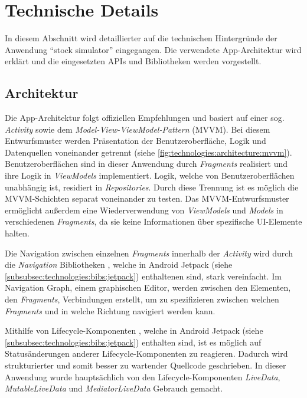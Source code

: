 \documentclass[a4paper]{article}
\begin{document}
\section{Technische Details}
\label{sec:technologies}
In diesem Abschnitt wird detaillierter auf die technischen Hintergründe der Anwendung "`stock simulator"' eingegangen. Die verwendete App-Architektur wird erklärt und die eingesetzten APIs und Bibliotheken werden vorgestellt.


\subsection{Architektur}
\label{subsec:technologies:architecture}
Die App-Architektur folgt offiziellen Empfehlungen \autocite{google_recommendations} und basiert auf einer sog. \textit{Activity} sowie dem \textit{Model-View-ViewModel-Pattern} (MVVM).
Bei diesem Entwurfsmuster werden Präsentation der Benutzeroberfläche, Logik und Datenquellen voneinander getrennt (siehe \autoref{fig:technologies:architecture:mvvm}).
Benutzeroberflächen sind in dieser Anwendung durch \textit{Fragments} realisiert und ihre Logik in \textit{ViewModels} implementiert.
Logik, welche von Benutzeroberflächen unabhängig ist, residiert in \textit{Repositories}.
Durch diese Trennung ist es möglich die MVVM-Schichten separat voneinander zu testen.
Das MVVM-Entwurfsmuster ermöglicht außerdem eine Wiederverwendung von \textit{ViewModels} und \textit{Models} in verschiedenen \textit{Fragments}, da sie keine Informationen über spezifische UI-Elemente halten.

Die Navigation zwischen einzelnen \textit{Fragments} innerhalb der \textit{Activity} wird durch die \textit{Navigation} Bibliotheken \autocite{android_navigation}, welche in Android Jetpack (siehe \autoref{subsubsec:technologies:bibs:jetpack}) enthaltenen sind, stark vereinfacht. Im Navigation Graph, einem graphischen Editor, werden zwischen den Elementen, den \textit{Fragments}, Verbindungen erstellt, um zu spezifizieren zwischen welchen \textit{Fragments} und in welche Richtung navigiert werden kann.

Mithilfe von Lifecycle-Komponenten \autocite{android_lifecycle}, welche in Android Jetpack (siehe \autoref{subsubsec:technologies:bibs:jetpack}) enthalten sind, ist es möglich auf Statusänderungen anderer Life\-cycle-Komponenten zu reagieren. Dadurch wird strukturierter und somit besser zu wartender Quellcode geschrieben. In dieser Anwendung wurde hauptsächlich von den Lifecycle-Komponenten \textit{LiveData}, \textit{MutableLiveData} und \textit{MediatorLiveData} Gebrauch gemacht.
\end{document}
